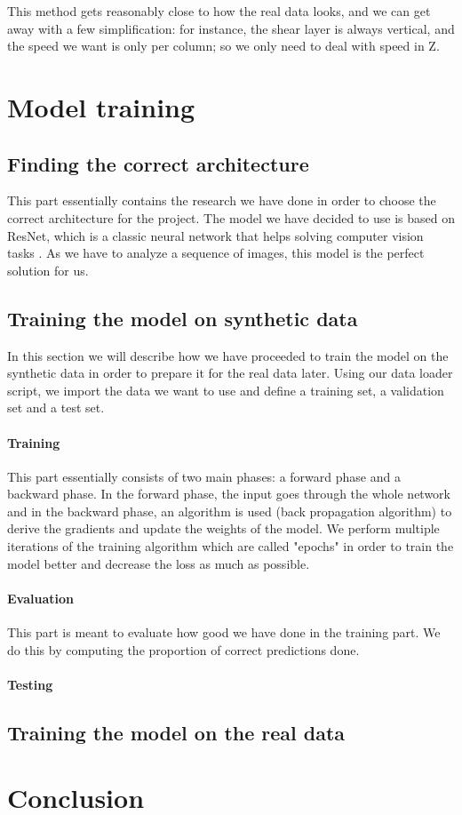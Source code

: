 \documentclass[10pt,conference]{IEEEtran}
\begin{document}
This method gets reasonably close to how the real data looks, and we can get away with a few simplification: for instance, the shear layer is always vertical, and the speed we want is only per column; so we only need to deal with speed in Z.

\section{Model training}
\subsection{Finding the correct architecture}
This part essentially contains the research we have done in order to choose the correct architecture for the project. The model we have decided to use is based on ResNet, which is a classic neural network that helps solving computer vision tasks \cite{hara3dcnns}. As we have to analyze a sequence of images, this model is the perfect solution for us.

\subsection{Training the model on synthetic data}
In this section we will describe how we have proceeded to train the model on the synthetic data in order to prepare it for the real data later. Using our data loader script, we import the data we want to use and define a training set, a validation set and a test set.
\paragraph{Training} This part essentially consists of two main phases: a forward phase and a backward phase. In the forward phase, the input goes through the whole network and in the backward phase, an algorithm is used (back propagation algorithm) to derive the gradients and update the weights of the model. We perform multiple iterations of the training algorithm which are called "epochs" in order to train the model better and decrease the loss as much as possible.
\paragraph{Evaluation} This part is meant to evaluate how good we have done in the training part. We do this by computing the proportion of correct predictions done.
\paragraph{Testing} %

\subsection{Training the model on the real data}

\section{Conclusion}



\end{document}

